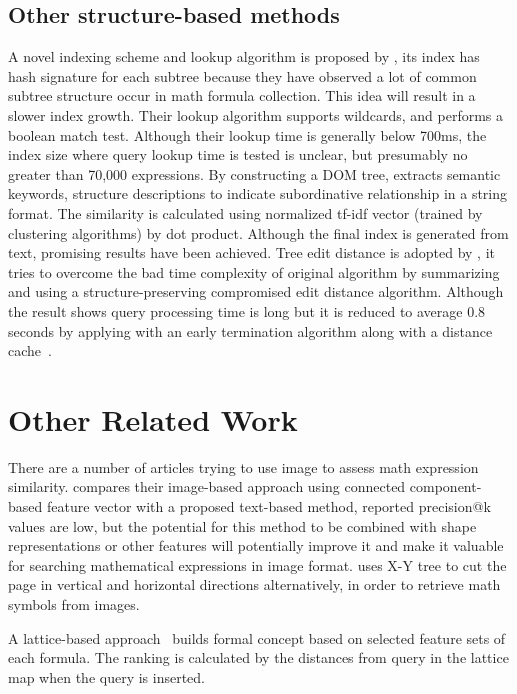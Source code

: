 \subsection*{Other structure-based methods}
A novel indexing scheme and lookup algorithm is proposed by \cite{newretrievalsystem}, its index has hash signature for each subtree because they have observed a lot of common subtree structure occur in math formula collection. This idea will result in a slower index growth. Their lookup algorithm supports wildcards, and performs a boolean match test. Although their lookup time is generally below 700ms, the index size where query lookup time is tested is unclear, but presumably no greater than 70,000 expressions.
By constructing a DOM tree, \cite{DOMextraction} extracts semantic keywords, structure descriptions to indicate subordinative relationship in a string format. The similarity is calculated using normalized tf-idf vector (trained by clustering algorithms) by dot product. Although the final index is generated from text, promising results have been achieved.  
Tree edit distance is adopted by \cite{editdisXML11}, it tries to overcome the bad time complexity of original algorithm by summarizing and using a structure-preserving compromised edit distance algorithm. Although the result shows query processing time is long but it is reduced to average 0.8 seconds by applying with an early termination algorithm along with a distance cache~\cite{editdisXML13}.

\section{Other Related Work}
There are a number of articles trying to use image to assess math expression similarity. \cite{imageb11} compares their image-based approach using connected component-based feature vector with a proposed text-based method, reported precision@k values are low, but the potential for this method to be combined with shape representations or other features will potentially improve it and make it valuable for searching mathematical expressions in image format. 
\cite{handwrite} uses \mbox{X-Y} tree to cut the page in vertical and horizontal directions alternatively, in order to retrieve math symbols from images. 

A lattice-based approach~\cite{lattice} builds formal concept based on selected feature sets of each formula. The ranking is calculated by the distances from query in the lattice map when the query is inserted. 


